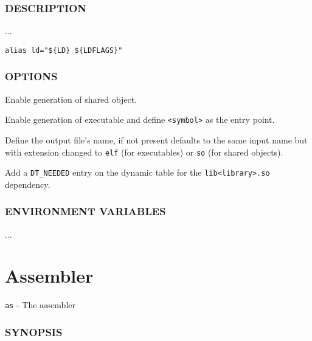 \subsubsection*{DESCRIPTION}

...

\begin{lstlisting}[style=bash]
alias ld="${LD} ${LDFLAGS}"
\end{lstlisting}

\subsubsection*{OPTIONS}

\begin{description}[style=multiline,leftmargin=5cm]
   \item[\texttt{{-}{-}shared}]
   Enable generation of shared object.
   \item[\texttt{-e <symbol>}]
   Enable generation of executable and
   define \texttt{<symbol>} as the entry point.
   \item[\texttt{-o <name>}]
   Define the output file's name,
   if not present defaults to the same input name but with
   extension changed to \texttt{elf} (for executables)
   or \texttt{so} (for shared objects).
   \item[\texttt{-l <library>}]
   Add a \texttt{DT\_NEEDED} entry on the dynamic table for the
   \texttt{lib<library>.so} dependency.
\end{description}

\subsubsection*{ENVIRONMENT VARIABLES}

\begin{description}[style=multiline,leftmargin5cm]
   \item[{\texttt{LD\_LIBRARY\_PATH}}]
   ...
\end{description}

\newpage
\section{Assembler}

\texttt{as} - The assembler

\subsubsection*{SYNOPSIS}

